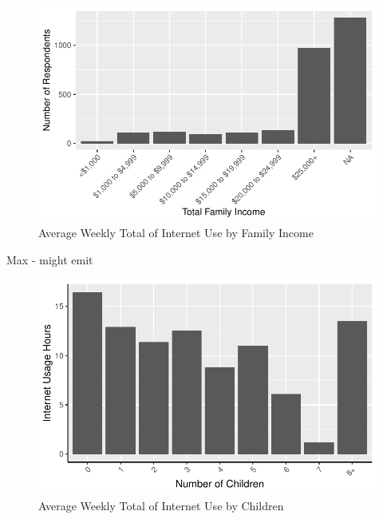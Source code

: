 \documentclass[
  letterpaper,
  DIV=11,
  numbers=noendperiod]{scrartcl}
\begin{document}
\begin{figure}

{\centering \includegraphics{paper_files/figure-pdf/fig-familyincomeandinternet-2.pdf}

}

\caption{\label{fig-familyincomeandinternet-2}Average Weekly Total of
Internet Use by Family Income}

\end{figure}

Max - might emit

\begin{figure}

{\centering \includegraphics{paper_files/figure-pdf/fig-childrenandinternet-1.pdf}

}

\caption{\label{fig-childrenandinternet}Average Weekly Total of Internet
Use by Children}

\end{figure}
\end{document}
